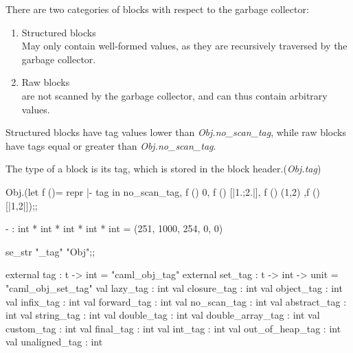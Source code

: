 \begin{enumerate}
  There are two categories of blocks with respect to the garbage collector:
  \begin{enumerate}
  \item Structured blocks \\
  May only contain well-formed values, as they are
  recursively traversed by the garbage collector.
  \item Raw blocks    \\
  are not scanned by the garbage collector, and can thus
  contain arbitrary values.
  \end{enumerate}
  Structured blocks have tag values lower than
  \textit{Obj.no\_scan\_tag}, while raw blocks have tags equal or
  greater than \textit{Obj.no\_scan\_tag}.
  

  The type of a block is its tag, which is stored in the block header.(\textit{Obj.tag})

  \begin{redcode}
Obj.(let f ()= repr |- tag in no_scan_tag, f () 0, f () [|1.;2.|], f
() (1,2) ,f ()[|1,2|]);;
\end{redcode}

\begin{bluecode}
- : int * int * int * int * int = (251, 1000, 254, 0, 0)    
\end{bluecode}

\begin{redcode}
se_str "_tag" "Obj";;  
\end{redcode}

\begin{bluecode}
    external tag : t -> int = "caml_obj_tag"
    external set_tag : t -> int -> unit = "caml_obj_set_tag"
    val lazy_tag : int
    val closure_tag : int
    val object_tag : int
    val infix_tag : int
    val forward_tag : int
    val no_scan_tag : int
    val abstract_tag : int
    val string_tag : int
    val double_tag : int
    val double_array_tag : int
    val custom_tag : int
    val final_tag : int
    val int_tag : int
    val out_of_heap_tag : int
    val unaligned_tag : int  
\end{bluecode}

\begin{enumerate}


\end{enumerate}
\end{enumerate}

